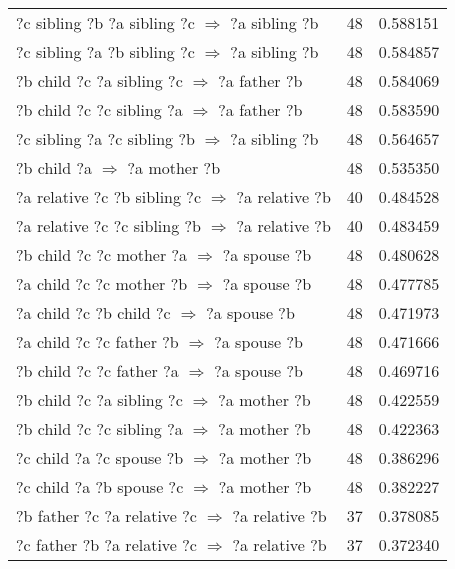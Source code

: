 \begin{longtable}{lrr}
   ?c  sibling  ?b  ?a  sibling  ?c   $\Rightarrow$ ?a  sibling  ?b &           48 &        0.588151 \\
   ?c  sibling  ?a  ?b  sibling  ?c   $\Rightarrow$ ?a  sibling  ?b &           48 &        0.584857 \\
      ?b  child  ?c  ?a  sibling  ?c   $\Rightarrow$ ?a  father  ?b &           48 &        0.584069 \\
      ?b  child  ?c  ?c  sibling  ?a   $\Rightarrow$ ?a  father  ?b &           48 &        0.583590 \\
   ?c  sibling  ?a  ?c  sibling  ?b   $\Rightarrow$ ?a  sibling  ?b &           48 &        0.564657 \\
                       ?b  child  ?a   $\Rightarrow$ ?a  mother  ?b &           48 &        0.535350 \\
 ?a  relative  ?c  ?b  sibling  ?c   $\Rightarrow$ ?a  relative  ?b &           40 &        0.484528 \\
 ?a  relative  ?c  ?c  sibling  ?b   $\Rightarrow$ ?a  relative  ?b &           40 &        0.483459 \\
       ?b  child  ?c  ?c  mother  ?a   $\Rightarrow$ ?a  spouse  ?b &           48 &        0.480628 \\
       ?a  child  ?c  ?c  mother  ?b   $\Rightarrow$ ?a  spouse  ?b &           48 &        0.477785 \\
        ?a  child  ?c  ?b  child  ?c   $\Rightarrow$ ?a  spouse  ?b &           48 &        0.471973 \\
       ?a  child  ?c  ?c  father  ?b   $\Rightarrow$ ?a  spouse  ?b &           48 &        0.471666 \\
       ?b  child  ?c  ?c  father  ?a   $\Rightarrow$ ?a  spouse  ?b &           48 &        0.469716 \\
      ?b  child  ?c  ?a  sibling  ?c   $\Rightarrow$ ?a  mother  ?b &           48 &        0.422559 \\
      ?b  child  ?c  ?c  sibling  ?a   $\Rightarrow$ ?a  mother  ?b &           48 &        0.422363 \\
       ?c  child  ?a  ?c  spouse  ?b   $\Rightarrow$ ?a  mother  ?b &           48 &        0.386296 \\
       ?c  child  ?a  ?b  spouse  ?c   $\Rightarrow$ ?a  mother  ?b &           48 &        0.382227 \\
  ?b  father  ?c  ?a  relative  ?c   $\Rightarrow$ ?a  relative  ?b &           37 &        0.378085 \\
  ?c  father  ?b  ?a  relative  ?c   $\Rightarrow$ ?a  relative  ?b &           37 &        0.372340 \\

\end{longtable}
